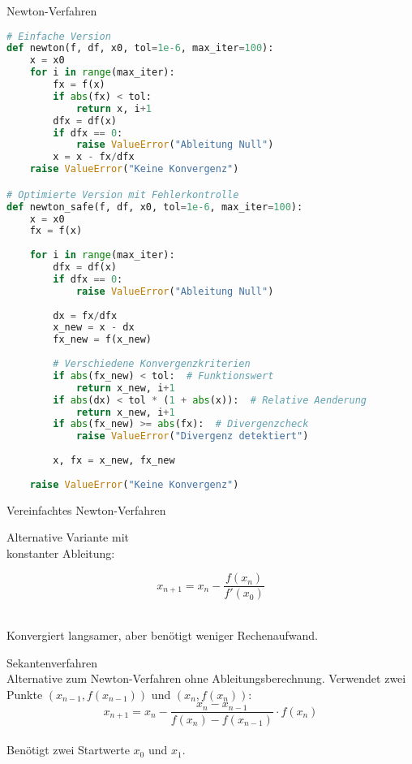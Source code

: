 \begin{examplecode}{Newton-Verfahren}
\begin{lstlisting}[language=Python, style=basesmol]
# Einfache Version
def newton(f, df, x0, tol=1e-6, max_iter=100):
    x = x0
    for i in range(max_iter):
        fx = f(x)
        if abs(fx) < tol:
            return x, i+1
        dfx = df(x)
        if dfx == 0:
            raise ValueError("Ableitung Null")
        x = x - fx/dfx
    raise ValueError("Keine Konvergenz")

# Optimierte Version mit Fehlerkontrolle
def newton_safe(f, df, x0, tol=1e-6, max_iter=100):
    x = x0
    fx = f(x)
    
    for i in range(max_iter):
        dfx = df(x)
        if dfx == 0:
            raise ValueError("Ableitung Null")
            
        dx = fx/dfx
        x_new = x - dx
        fx_new = f(x_new)
        
        # Verschiedene Konvergenzkriterien
        if abs(fx_new) < tol:  # Funktionswert
            return x_new, i+1
        if abs(dx) < tol * (1 + abs(x)):  # Relative Aenderung
            return x_new, i+1
        if abs(fx_new) >= abs(fx):  # Divergenzcheck
            raise ValueError("Divergenz detektiert")
            
        x, fx = x_new, fx_new
        
    raise ValueError("Keine Konvergenz")
\end{lstlisting}
\end{examplecode}

\begin{theorem}{Vereinfachtes Newton-Verfahren}\\
    \begin{minipage}{0.5\textwidth}
        Alternative Variante mit \\ konstanter Ableitung:
    \end{minipage}
    \begin{minipage}{0.25\textwidth}
        \vspace{-5mm}
        $$x_{n+1} = x_n - \frac{f(x_n)}{f'(x_0)}$$
    \end{minipage}
    \vspace{1mm}\\
    Konvergiert langsamer, aber benötigt weniger Rechenaufwand.
\end{theorem}

\begin{concept}{Sekantenverfahren}\\
    Alternative zum Newton-Verfahren ohne Ableitungsberechnung. Verwendet zwei Punkte $(x_{n-1}, f(x_{n-1}))$ und $(x_n, f(x_n))$:
    \vspace{-2mm}\\
    $$x_{n+1} = x_n - \frac{x_n-x_{n-1}}{f(x_n)-f(x_{n-1})} \cdot f(x_n)$$
    \vspace{-3mm}\\
    Benötigt zwei Startwerte $x_0$ und $x_1$.
\end{concept}


